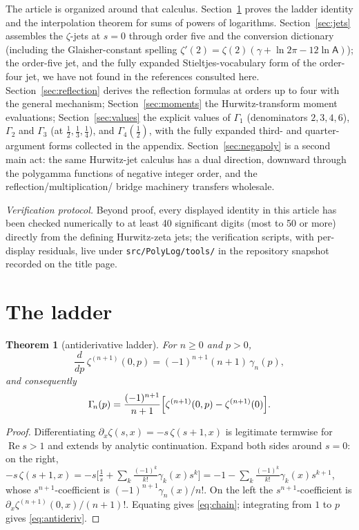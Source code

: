 \documentclass[11pt]{article}
\newtheorem{theorem}{Theorem}[section]
\theoremstyle{remark}
\newcommand{\Glaisher}{\mathsf{A}}
\begin{document}
The article is organized around that calculus. Section~\ref{sec:ladder}
proves the ladder identity and the interpolation theorem for sums of powers
of logarithms. Section~\ref{sec:jets} assembles the $\zeta$-jets at $s=0$
through order five and the conversion dictionary (including the
Glaisher-constant spelling
$\zeta'(2)=\zeta(2)(\gamma+\ln2\pi-12\ln\Glaisher)$); the order-five jet,
and the fully expanded Stieltjes-vocabulary form of the order-four jet, we
have not found in the references consulted here.
Section~\ref{sec:reflection} derives the reflection formulas at orders up to
four with the general mechanism; Section~\ref{sec:moments} the
Hurwitz-transform moment evaluations; Section~\ref{sec:values} the explicit
values of $\Gamma_{\!1}$ (denominators $2,3,4,6$), $\Gamma_{\!2}$ and
$\Gamma_{\!3}$ (at $\tfrac12,\tfrac13,\tfrac14$), and $\Gamma_{\!4}(\tfrac12)$,
with the fully expanded third- and quarter-argument forms collected in the
appendix. Section~\ref{sec:negapoly} is a second main act: the same
Hurwitz-jet calculus has a dual direction, downward through the polygamma
functions of negative integer order, and the reflection/multiplication/
bridge machinery transfers wholesale.

\emph{Verification protocol.} Beyond proof, every displayed identity in
this article has been checked numerically to at least 40 significant
digits (most to 50 or more) directly from the defining Hurwitz-zeta jets;
the verification scripts, with per-display residuals, live under
\texttt{src/PolyLog/tools/} in the repository snapshot recorded on the
title page.

\section{The ladder}\label{sec:ladder}

\begin{theorem}[antiderivative ladder]\label{thm:ladder}
For $n\ge0$ and $p>0$,
\begin{equation}\label{eq:chain}
\frac{d}{dp}\,\zeta^{(n+1)}(0,p)=(-1)^{n+1}(n+1)\,\gamma_n(p),
\end{equation}
and consequently
\begin{equation}\label{eq:antideriv}
\Gamma_{\!n}(p)=\frac{(-1)^{n+1}}{n+1}\Bigl[\zeta^{(n+1)}(0,p)-\zeta^{(n+1)}(0)\Bigr].
\end{equation}
\end{theorem}

\begin{proof}
Differentiating $\partial_x\zeta(s,x)=-s\,\zeta(s+1,x)$ is legitimate
termwise for $\operatorname{Re}s>1$ and extends by analytic continuation.
Expand both sides around $s=0$: on the right,
$-s\,\zeta(s+1,x)=-s\bigl[\tfrac1s+\sum_k\tfrac{(-1)^k}{k!}\gamma_k(x)s^k\bigr]
=-1-\sum_k\tfrac{(-1)^k}{k!}\gamma_k(x)s^{k+1}$,
whose $s^{n+1}$-coefficient is $(-1)^{n+1}\gamma_n(x)/n!$. On the left the
$s^{n+1}$-coefficient is $\partial_x\zeta^{(n+1)}(0,x)/(n+1)!$. Equating gives
\eqref{eq:chain}; integrating from $1$ to $p$ gives \eqref{eq:antideriv}.
\end{proof}
\end{document}
